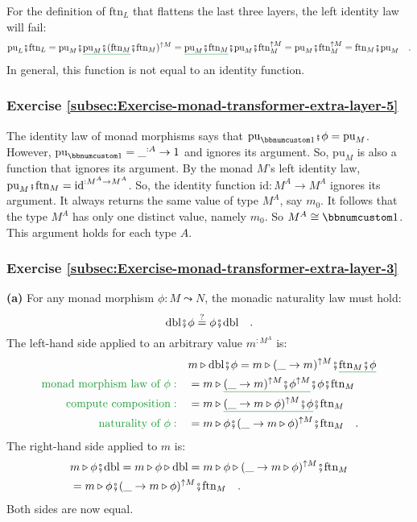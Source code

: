 For the definition of $\text{ftn}_{L}$ that flattens the last three
layers, the left identity law will fail:
\[
\text{pu}_{L}\bef\text{ftn}_{L}=\text{pu}_{M}\bef\gunderline{\text{pu}_{M}\bef(\text{ftn}_{M}}\bef\text{ftn}_{M})^{\uparrow M}=\gunderline{\text{pu}_{M}\bef\text{ftn}_{M}}\bef\text{pu}_{M}\bef\text{ftn}_{M}^{\uparrow M}=\text{pu}_{M}\bef\text{ftn}_{M}^{\uparrow M}=\text{ftn}_{M}\bef\text{pu}_{M}\quad.
\]
In general, this function is not equal to an identity function.

\subsubsection*{Exercise \ref{subsec:Exercise-monad-transformer-extra-layer-5}}

The identity law of monad morphisms says that $\text{pu}_{\bbnum 1}\bef\phi=\text{pu}_{M}$.
However, $\text{pu}_{\bbnum 1}=\_^{:A}\rightarrow1$ and ignores its
argument. So, $\text{pu}_{M}$ is also a function that ignores its
argument. By the monad $M$\textsf{'}s left identity law, $\text{pu}_{M}\bef\text{ftn}_{M}=\text{id}^{:M^{A}\rightarrow M^{A}}$.
So, the identity function $\text{id}:M^{A}\rightarrow M^{A}$ ignores
its argument. It always returns the same value of type $M^{A}$, say
$m_{0}$. It follows that the type $M^{A}$ has only one distinct
value, namely $m_{0}$. So $M^{A}\cong\bbnum 1$. This argument holds
for each type $A$. 

\subsubsection*{Exercise \ref{subsec:Exercise-monad-transformer-extra-layer-3}}

\textbf{(a)} For any monad morphism $\phi:M\leadsto N$, the monadic
naturality law must hold:
\[
\text{dbl}\bef\phi\overset{?}{=}\phi\bef\text{dbl}\quad.
\]
The left-hand side applied to an arbitrary value $m^{:M^{A}}$ is:
\begin{align*}
 & m\triangleright\text{dbl}\bef\phi=m\triangleright(\_\rightarrow m)^{\uparrow M}\bef\gunderline{\text{ftn}_{M}\bef\phi}\\
{\color{greenunder}\text{monad morphism law of }\phi:}\quad & =m\triangleright\gunderline{(\_\rightarrow m)^{\uparrow M}\bef\phi^{\uparrow M}}\bef\phi\bef\text{ftn}_{M}\\
{\color{greenunder}\text{compute composition}:}\quad & =m\triangleright\gunderline{(\_\rightarrow m\triangleright\phi)^{\uparrow M}\bef\phi}\bef\text{ftn}_{M}\\
{\color{greenunder}\text{naturality of }\phi:}\quad & =m\triangleright\phi\bef(\_\rightarrow m\triangleright\phi)^{\uparrow M}\bef\text{ftn}_{M}\quad.
\end{align*}
The right-hand side applied to $m$ is:
\begin{align*}
 & m\triangleright\phi\bef\text{dbl}=m\triangleright\phi\triangleright\text{dbl}=m\triangleright\phi\triangleright(\_\rightarrow m\triangleright\phi)^{\uparrow M}\bef\text{ftn}_{M}\\
 & =m\triangleright\phi\bef(\_\rightarrow m\triangleright\phi)^{\uparrow M}\bef\text{ftn}_{M}\quad.
\end{align*}
Both sides are now equal.


